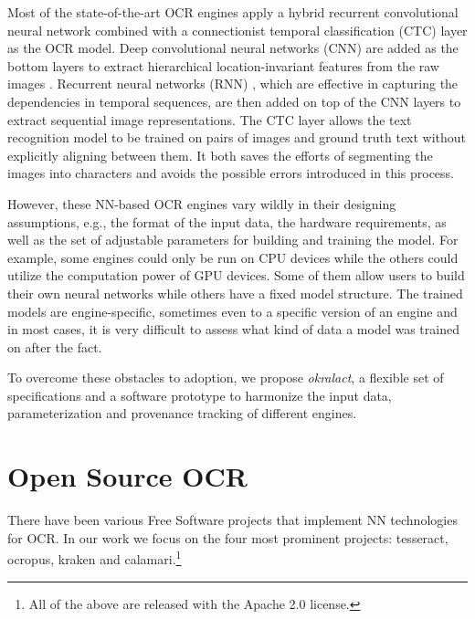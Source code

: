 \documentclass[conference]{IEEEtran}
\begin{document}
Most of the state-of-the-art OCR engines apply a hybrid recurrent convolutional neural network combined with a connectionist temporal classification (CTC) \cite{graves2006connectionist} layer as the OCR model. Deep convolutional neural networks (CNN) \cite{krizhevsky2012imagenet} are added as the bottom layers to extract hierarchical location-invariant features from the raw images \cite{wick2018improving}. Recurrent neural networks (RNN) \cite{mikolov2010recurrent}, which are effective in capturing the dependencies in temporal sequences, are then added on top of the CNN layers to extract sequential image representations. The CTC layer allows the text recognition model to be trained on pairs of images and ground truth text without explicitly aligning between them. It both saves the efforts of segmenting the images into characters and avoids the possible errors introduced in this process. 

However, these NN-based OCR engines vary wildly in their designing assumptions, e.g., the format of the input data, the hardware requirements, as well as the set of adjustable parameters for building and training the model. For example, some engines could only be run on CPU devices while the others could utilize the computation power of GPU devices. Some of them allow users to build their own neural networks while others have a fixed model structure. The trained models are engine-specific, sometimes even to a specific version of an engine and in most cases, it is very difficult to assess what kind of data a model was trained on after the fact.

% 

To overcome these obstacles to adoption, we propose \textit{okralact}, a flexible set of specifications
and a software prototype to harmonize the input data, parameterization and provenance
tracking of different engines. 

\section*{Open Source OCR}

There have been various Free Software projects that implement NN technologies
for OCR. In our work we focus on the four most prominent projects: tesseract, ocropus,
kraken and calamari.\footnote{All of the above are released with the Apache 2.0 license.}
\end{document}
